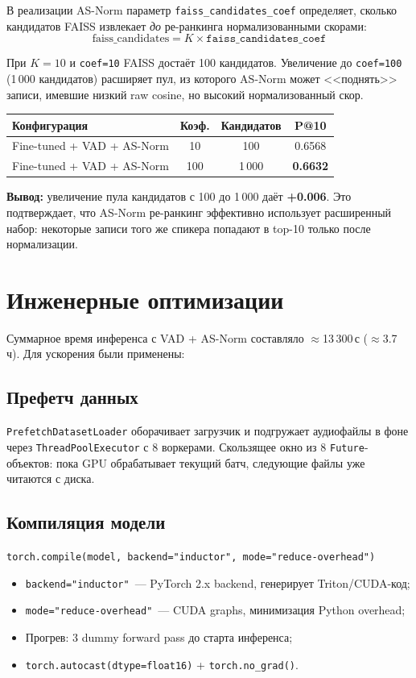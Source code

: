 \documentclass[12pt,a4paper]{article}
\begin{document}
В реализации AS-Norm параметр \texttt{faiss\_candidates\_coef} определяет, сколько кандидатов FAISS извлекает \emph{до} ре-ранкинга нормализованными скорами:
\[
  \text{faiss\_candidates} = K \times \texttt{faiss\_candidates\_coef}
\]

При $K=10$ и \texttt{coef=10} FAISS достаёт 100 кандидатов. Увеличение до \texttt{coef=100} (1\,000 кандидатов) расширяет пул, из которого AS-Norm может <<поднять>> записи, имевшие низкий raw cosine, но высокий нормализованный скор.

\begin{tabular}{l c c c}
\hline
Конфигурация & Коэф. & Кандидатов & P@10 \\
\hline
Fine-tuned + VAD + AS-Norm & 10 & 100 & 0.6568 \\
Fine-tuned + VAD + AS-Norm & 100 & 1\,000 & \textbf{0.6632} \\
\hline
\end{tabular}

\bigskip
\textbf{Вывод:} увеличение пула кандидатов с 100 до 1\,000 даёт \textbf{+0.006}. Это подтверждает, что AS-Norm ре-ранкинг эффективно использует расширенный набор: некоторые записи того же спикера попадают в top-10 только после нормализации.

\section{Инженерные оптимизации}

Суммарное время инференса с VAD + AS-Norm составляло $\approx$13\,300\,с ($\approx$3.7\,ч). Для ускорения были применены:

\subsection{Префетч данных}

\texttt{PrefetchDatasetLoader} оборачивает загрузчик и подгружает аудиофайлы в фоне через \texttt{ThreadPoolExecutor} с 8 воркерами. Скользящее окно из 8 \texttt{Future}-объектов: пока GPU обрабатывает текущий батч, следующие файлы уже читаются с диска.

\subsection{Компиляция модели}

\texttt{torch.compile(model, backend="inductor", mode="reduce-overhead")}

\begin{itemize}
  \item \texttt{backend="inductor"}~--- PyTorch 2.x backend, генерирует Triton/CUDA-код;
  \item \texttt{mode="reduce-overhead"}~--- CUDA graphs, минимизация Python overhead;
  \item Прогрев: 3 dummy forward pass до старта инференса;
  \item \texttt{torch.autocast(dtype=float16)} + \texttt{torch.no\_grad()}.
\end{itemize}
\end{document}
